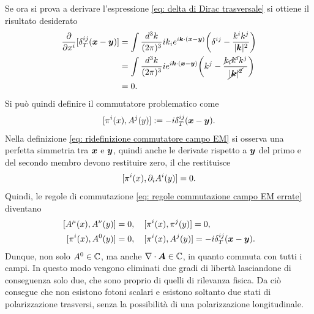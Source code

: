 Se ora si prova a derivare l'espressione \eqref{eq: delta di Dirac trasversale} si ottiene il risultato desiderato
\begin{equation}
    \begin{split}
        \frac{\partial}{\partial x^i}[\delta_T^{ij}(\bm{x} - \bm{y})] &= \int\frac{d^3k}{(2\pi)^3}ik_ie^{i\bm{k}\cdot(\bm{x} - \bm{y})}\bigg(\delta^{ij} - \frac{k^ik^j}{|\bm{k}|^2}\bigg) \\
        &= \int\frac{d^3k}{(2\pi)^3}ie^{i\bm{k}\cdot(\bm{x} - \bm{y})}\bigg(k^j - \frac{\cancel{k_ik^i}k^j}{\cancel{|\bm{k}|^2}}\bigg) \\
        &= 0.
    \end{split}
\end{equation}
Si può quindi definire il commutatore problematico come 
\begin{equation}
\label{eq: ridefinizione commutatore campo EM}
    [\pi^i(x),A^j(y)] := -i\delta^{ij}_T(\bm{x} - \bm{y}).
\end{equation}
Nella definizione \eqref{eq: ridefinizione commutatore campo EM} si osserva una perfetta simmetria tra $\bm{x}$ e $\bm{y}$, quindi anche le derivate rispetto a $\bm{y}$ del primo e del secondo membro devono restituire zero, il che restituisce 
\begin{equation}
    [\pi^i(x),\partial_i A^i(y)] = 0.
\end{equation}
Quindi, le regole di commutazione \eqref{eq: regole commutazione campo EM errate} diventano
\begin{equation}
\label{eq: regole commutazione campo EM}
    \begin{split}
        \comm{A^\mu(x)}{A^\nu(y)} &= 0,\quad \comm{\pi^i(x)}{\pi^j(y)} = 0, \\
        \comm{\pi^i(x)}{A^0(y)} &= 0,\quad \comm{\pi^i(x)}{A^j(y)} = -i\delta^{ij}_T(\vx - \vy).
    \end{split}
\end{equation}
Dunque, non solo $A^0\in\mathbb{C}$, ma anche $\nabla\cdot\bm{A}\in\mathbb{C}$, in quanto commuta con tutti i campi. In questo modo vengono eliminati due gradi di libertà lasciandone di conseguenza solo due, che sono proprio di quelli di rilevanza fisica. Da ciò consegue che non esistono fotoni scalari e esistono soltanto due stati di polarizzazione trasversi, senza la possibilità di una polarizzazione longitudinale. 

